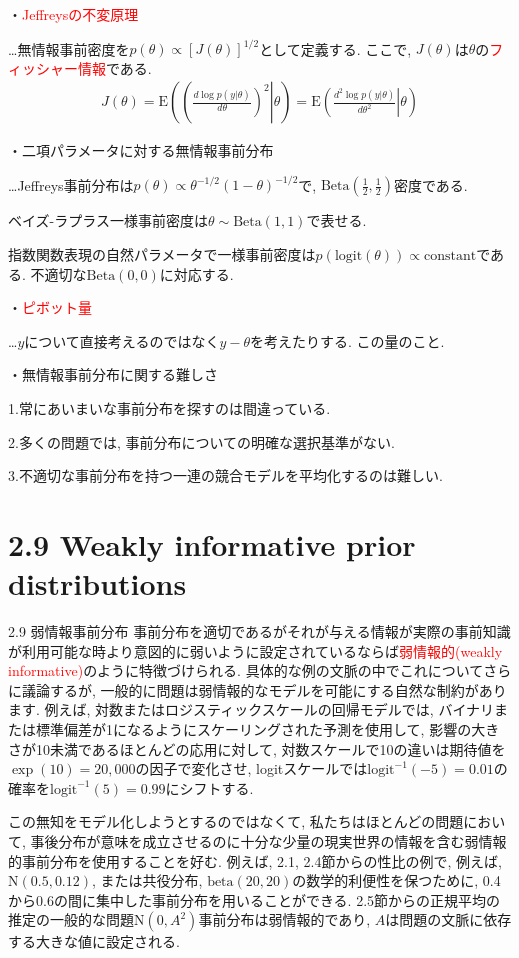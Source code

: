 \documentclass[10pt,dvipdfmx,a4]{beamer}
\newcommand{\eqn}[1]{\begin{align*}#1\end{align*}}
\newcommand{\tcr}[1]{\textcolor{red}{#1}}
\begin{document}
\begin{frame}
・\tcr{Jeffreysの不変原理}

…無情報事前密度を$p(\theta)\propto[J(\theta)]^{1/2}$として定義する.
ここで, $J(\theta)$は$\theta$の\tcr{フィッシャー情報}である.
\eqn{J(\theta)=\text{E}\left(\left(\left. \tfrac{d\log p(y|\theta)}{d\theta}\right)^2\right|\theta\right)=\text{E}\left(\left.\tfrac{d^2\log p(y|\theta)}{d\theta^2}\right|\theta\right)}

・二項パラメータに対する無情報事前分布

…Jeffreys事前分布は$p(\theta)\propto\theta^{-1/2}(1-\theta)^{-1/2}$で, $\text{Beta}(\tfrac{1}{2},\tfrac{1}{2})$密度である.

ベイズ-ラプラス一様事前密度は$\theta\sim\text{Beta}(1,1)$で表せる.

指数関数表現の自然パラメータで一様事前密度は$p(\text{logit}(\theta))\propto\text{constant}$である.
不適切な$\text{Beta}(0,0)$に対応する.

・\tcr{ピボット量}

…$y$について直接考えるのではなく$y-\theta$を考えたりする.
この量のこと.

・無情報事前分布に関する難しさ

1.常にあいまいな事前分布を探すのは間違っている.

2.多くの問題では, 事前分布についての明確な選択基準がない.

3.不適切な事前分布を持つ一連の競合モデルを平均化するのは難しい.
\end{frame}


\section{2.9 Weakly informative prior distributions}
\begin{frame}{2.9 弱情報事前分布}
事前分布を適切であるがそれが与える情報が実際の事前知識が利用可能な時より意図的に弱いように設定されているならば\tcr{弱情報的(weakly informative)}のように特徴づけられる.
具体的な例の文脈の中でこれについてさらに議論するが, 一般的に問題は弱情報的なモデルを可能にする自然な制約があります.
例えば, 対数またはロジスティックスケールの回帰モデルでは, バイナリまたは標準偏差が1になるようにスケーリングされた予測を使用して, 影響の大きさが10未満であるほとんどの応用に対して, 対数スケールで10の違いは期待値を$\exp(10)= 20,000$の因子で変化させ, logitスケールでは$\text{logit}^{-1}(-5)= 0.01$の確率を$\text{logit}^{-1}(5)= 0.99$にシフトする.

この無知をモデル化しようとするのではなくて, 私たちはほとんどの問題において, 事後分布が意味を成立させるのに十分な少量の現実世界の情報を含む弱情報的事前分布を使用することを好む.
例えば, 2.1, 2.4節からの性比の例で, 例えば, $\text{N}(0.5,0.12)$, または共役分布, $\text{beta}(20,20)$の数学的利便性を保つために, 0.4から0.6の間に集中した事前分布を用いることができる.
2.5節からの正規平均の推定の一般的な問題$\text{N}(0,A^2)$事前分布は弱情報的であり, $A$は問題の文脈に依存する大きな値に設定される.
\end{frame}
\end{document}
